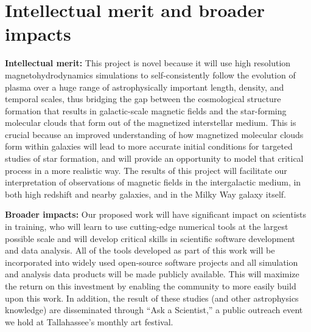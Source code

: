 \vspace{-4mm}
\section{Intellectual merit and broader impacts}
\vspace{-3mm}

\textbf{Intellectual merit:} This project is novel because it will use
high resolution magnetohydrodynamics simulations to self-consistently
follow the evolution of plasma over a huge range of astrophysically
important length, density, and temporal scales, thus bridging the gap
between the cosmological structure formation that results in
galactic-scale magnetic fields and the star-forming molecular clouds
that form out of the magnetized interstellar medium.  This is crucial
because an improved understanding of how magnetized molecular clouds
form within galaxies will lead to more accurate initial conditions for
targeted studies of star formation, and will provide an opportunity to
model that critical process in a more realistic way.  The results of
this project will facilitate our interpretation of observations of
magnetic fields in the intergalactic medium, in both high redshift and
nearby galaxies, and in the Milky Way galaxy itself.

\vspace{1mm}

\noindent\textbf{Broader impacts:} Our proposed work will have significant
impact on scientists in training, who will learn to use cutting-edge numerical
tools at the largest possible scale and will develop critical skills in
scientific software development and data analysis.  All of the tools developed
as part of this work will be incorporated into widely used open-source software
projects and all simulation and analysis data products will be made publicly
available.  This will maximize the return on this investment by enabling the
community to more easily build upon this work.  In addition, the result of these
studies (and other astrophysics knowledge) are disseminated through ``Ask a
Scientist,'' a public outreach event we hold at
Tallahassee's monthly art festival. 
